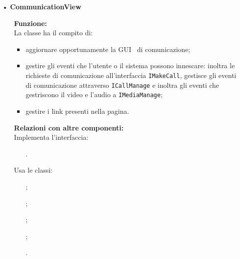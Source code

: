 {\begin{sloppypar}
{\begin{itemize}
\begin{itemize}
					\texttt{+ void callActive(String remoteVideo, String nome);}\\
					Visualizza il pannello di informazioni di chiamata e imposta il video remoto con la stringa 
					\texttt{remoteVideo} e con il nome dell’utente con cui si è instaurata la comunicazione.\\
					\texttt{+ void updateFormInfoChiamata(Vector<Double> datiChiamata);}\\
					Visualizza le statistiche delle chiamate contenute nel vettore \texttt{datiChiamata}.\\
					\texttt{+ void windowClosing();}\\
					Gestisce l'evento di chiusura della finestra della GUI\g~ di comunicazione effettuando il logout e in caso di comunicazione attiva termina la chiamata.\\
			\end{itemize}
		
		\item[•] \textbf{CommunicationView}
			\begin{itemize}
				\item[]  \textbf{Funzione:} \\
				La classe ha il compito di:
				\begin{itemize}
					\item aggiornare opportunamente la GUI\g~ di comunicazione;
					\item gestire gli eventi che l'utente o il sistema possono innescare: inoltra 
					le richieste di comunicazione all’interfaccia \texttt{IMakeCall}, gestisce 
					gli eventi di comunicazione attraverso \texttt{ICallManage} e inoltra gli 
					eventi che gestriscono il video e l’audio a \texttt{IMediaManage};
					\item gestire i link presenti nella pagina.
				\end{itemize}
				\item[]  \textbf{Relazioni con altre componenti:} \\
				Implementa l’interfaccia:
				\begin{itemize}
					\item[] .
				\end{itemize}

				Usa le classi:
				\begin{itemize}
					\item[] ;
					\item[] ;
					\item[] ;
					\item[] ;
					\item[] .
				\end{itemize}
			

\end{itemize}
\end{itemize}}
\end{sloppypar}}
